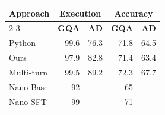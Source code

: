 \begin{tabular}{lrrrr}
\toprule
\textbf{Approach} & \multicolumn{2}{c}{\textbf{Execution}} & \multicolumn{2}{c}{\textbf{Accuracy}} \\
\cmidrule{2-3}\cmidrule{4-5} & \textbf{GQA} & \textbf{AD} & \textbf{GQA} & \textbf{AD} \\
\midrule
Python & 99.6 & 76.3 & 71.8 & 64.5 \\
Ours & 97.9 & 82.8 & 71.4 & 63.4 \\
\midrule
Multi-turn & 99.5 & 89.2 & 72.3 & 67.7 \\
\midrule
Nano Base & 92 & \multicolumn{1}{c}{--} & 65 & \multicolumn{1}{c}{--} \\
Nano SFT & 99 & \multicolumn{1}{c}{--} & 71 & \multicolumn{1}{c}{--} \\
\bottomrule
\end{tabular}
